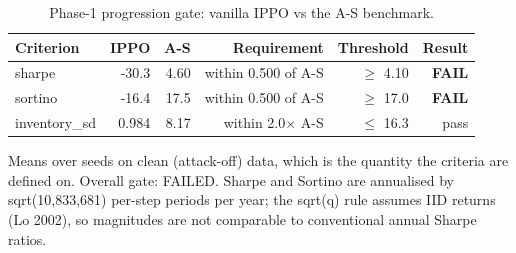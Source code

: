 \begin{table}[htbp]
  \centering
  \caption{Phase-1 progression gate: vanilla IPPO vs the A-S benchmark.}
  \label{tab:gate}
  \begin{tabular}{lrrrrr}
    \toprule
    Criterion & IPPO & A-S & Requirement & Threshold & Result \\
    \midrule
    sharpe & -30.3 & 4.60 & within 0.500 of A-S & $\geq$ 4.10 & \textbf{FAIL} \\
    sortino & -16.4 & 17.5 & within 0.500 of A-S & $\geq$ 17.0 & \textbf{FAIL} \\
    inventory\_sd & 0.984 & 8.17 & within 2.0$\times$ A-S & $\leq$ 16.3 & pass \\
    \bottomrule
  \end{tabular}
  \begin{minipage}{\linewidth}\vspace{4pt}\footnotesize Means over seeds on clean (attack-off) data, which is the quantity the criteria are defined on. Overall gate: FAILED. Sharpe and Sortino are annualised by sqrt(10,833,681) per-step periods per year; the sqrt(q) rule assumes IID returns (Lo 2002), so magnitudes are not comparable to conventional annual Sharpe ratios.\end{minipage}
\end{table}
